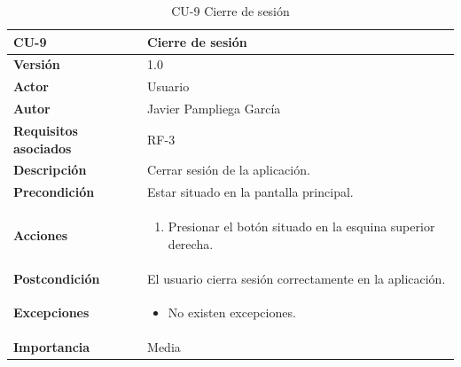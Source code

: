 \begin{table}[p]
	\centering
	\begin{tabularx}{\linewidth}{ p{} p{} }
		\toprule
		\textbf{CU-9}    & \textbf{Cierre de sesión}\\
		\toprule
		\textbf{Versión}              & 1.0    \\
            \textbf{Actor}                & Usuario \\
		\textbf{Autor}                & Javier Pampliega García \\
		\textbf{Requisitos asociados} & RF-3 \\
		\textbf{Descripción}          & Cerrar sesión de la aplicación. \\
		\textbf{Precondición}         & Estar situado en la pantalla principal. \\
		\textbf{Acciones}             &
		\begin{enumerate}
			\def\labelenumi{\arabic{enumi}.}
			\tightlist
			\item Presionar el botón situado en la esquina superior derecha.
		\end{enumerate}\\
		\textbf{Postcondición}        & El usuario cierra sesión correctamente en la aplicación. \\
		\textbf{Excepciones}          & \begin{itemize}
		    \item No existen excepciones.
		\end{itemize} \\
		\textbf{Importancia}          & Media \\
		\bottomrule
	\end{tabularx}
	\caption{CU-9 Cierre de sesión}
\end{table}